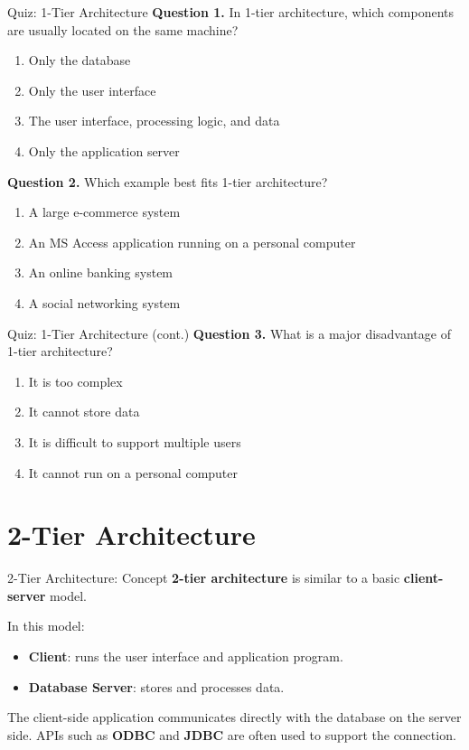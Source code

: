 \documentclass[aspectratio=169,11pt]{beamer}
\newcommand{\keyword}[1]{\textcolor{accent}{\textbf{#1}}}
\newcommand{\tightlist}{\setlength{\itemsep}{2pt}\setlength{\parskip}{0pt}}
\newcommand{\qoption}[2]{\item[#1.] #2}
\begin{document}
\begin{frame}{Quiz: 1-Tier Architecture}
\small
\textbf{Question 1.} In 1-tier architecture, which components are usually located on the same machine?
\begin{enumerate}
\tightlist
  \qoption{A}{Only the database}
  \qoption{B}{Only the user interface}
  \qoption{C}{The user interface, processing logic, and data}
  \qoption{D}{Only the application server}
\end{enumerate}

\textbf{Question 2.} Which example best fits 1-tier architecture?
\begin{enumerate}
\tightlist
  \qoption{A}{A large e-commerce system}
  \qoption{B}{An MS Access application running on a personal computer}
  \qoption{C}{An online banking system}
  \qoption{D}{A social networking system}
\end{enumerate}
\end{frame}

\begin{frame}{Quiz: 1-Tier Architecture (cont.)}
\small
\textbf{Question 3.} What is a major disadvantage of 1-tier architecture?
\begin{enumerate}
\tightlist
  \qoption{A}{It is too complex}
  \qoption{B}{It cannot store data}
  \qoption{C}{It is difficult to support multiple users}
  \qoption{D}{It cannot run on a personal computer}
\end{enumerate}
\end{frame}

\section{2-Tier Architecture}

\begin{frame}{2-Tier Architecture: Concept}
\small
\keyword{2-tier architecture} is similar to a basic \keyword{client-server} model.

\vspace{0.2cm}
In this model:
\begin{itemize}
\tightlist
  \item \keyword{Client}: runs the user interface and application program.
  \item \keyword{Database Server}: stores and processes data.
\end{itemize}

The client-side application communicates directly with the database on the server side. APIs such as \keyword{ODBC} and \keyword{JDBC} are often used to support the connection.
\end{frame}
\end{document}
